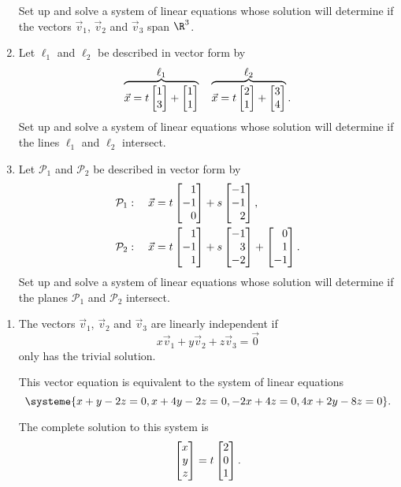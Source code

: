 \begin{exercises}
\begin{problist}
\begin{enumerate}
			Set up and solve a system of linear equations whose solution
			will determine if the vectors $\vec v_{1}$, $\vec v_{2}$ and $\vec
			v_{3}$ span $\R^{3}$.
			\item Let $\ell_1$ and $\ell_2$ be described in vector form by
			\[
				\overbrace{\vec x=t\mat{1\\3}+\mat{1\\1}}^{\displaystyle \ell_1}
				\quad
				\overbrace{\vec x=t\mat{2\\1}+\mat{3\\4}}^{\displaystyle \ell_2}.
			\]
			Set up and solve a system of linear equations whose solution will
			determine if the lines $\ell_{1}$ and $\ell_{2}$ intersect.
			\item Let $\mathcal{P}_{1}$ and $\mathcal{P}_{2}$
			be described in vector form by
			\[
				\begin{aligned}
					&\mathcal{P}_1:\quad \vec x=t\mat{1\\-1\\0}+s\mat{-1\\-1\\2},\\
					&\mathcal{P}_2:\quad \vec x=t\mat{1\\-1\\1}+s\mat{-1\\3\\-2}+\mat{0\\1\\-1}.
				\end{aligned}
			\]
			Set up and solve a system of linear equations whose solution
			will determine if the planes $\mathcal{P}_{1}$ and
			$\mathcal{P}_{2}$ intersect.
		\end{enumerate}
		\begin{solution}
			\begin{enumerate}
				\item The vectors $\vec v_{1}$, $\vec v_{2}$ and $\vec v_{3}$
				are linearly independent if 
				\[
					x\vec v_1+y\vec v_2+z\vec v_3=\vec 0
				\]
				only has the trivial solution.
				
				This vector equation is equivalent to the system of linear equations
				\[
					\systeme{x+y-2z=0,x+4y-2z=0,-2x+4z=0,4x+2y-8z=0}.
				\]
				
				The complete solution to this system is
				\[
					\mat{x\\y\\z}=t\mat{2\\0\\1}.
				\]
				

\end{enumerate}
\end{solution}
\end{problist}
\end{exercises}
